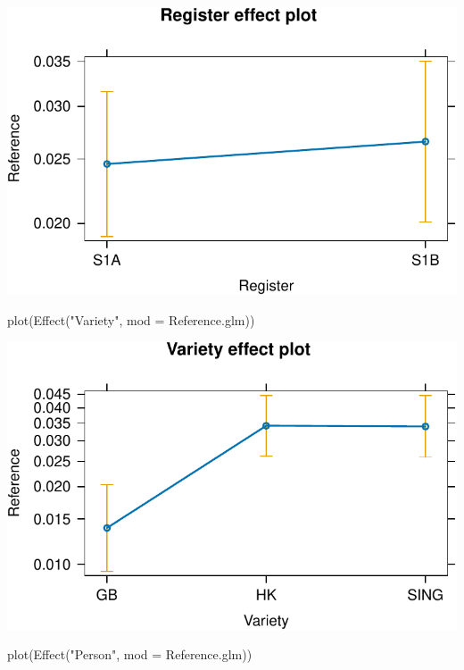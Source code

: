 \documentclass[
  11pt,
  letterpaper,
  DIV=11,
  numbers=noendperiod]{scrreprt}
\newenvironment{Shaded}{\begin{snugshade}}{\end{snugshade}}
\newcommand{\AttributeTok}[1]{\textcolor[rgb]{0.40,0.45,0.13}{#1}}
\newcommand{\FunctionTok}[1]{\textcolor[rgb]{0.28,0.35,0.67}{#1}}
\newcommand{\NormalTok}[1]{\textcolor[rgb]{0.00,0.23,0.31}{#1}}
\newcommand{\StringTok}[1]{\textcolor[rgb]{0.13,0.47,0.30}{#1}}
\begin{document}
\includegraphics{Logistic_regression_files/figure-pdf/unnamed-chunk-12-3.pdf}

\begin{Shaded}
\begin{Highlighting}[]
\FunctionTok{plot}\NormalTok{(}\FunctionTok{Effect}\NormalTok{(}\StringTok{"Variety"}\NormalTok{, }\AttributeTok{mod =}\NormalTok{ Reference.glm))}
\end{Highlighting}
\end{Shaded}

\includegraphics{Logistic_regression_files/figure-pdf/unnamed-chunk-12-4.pdf}

\begin{Shaded}
\begin{Highlighting}[]
\FunctionTok{plot}\NormalTok{(}\FunctionTok{Effect}\NormalTok{(}\StringTok{"Person"}\NormalTok{, }\AttributeTok{mod =}\NormalTok{ Reference.glm))}
\end{Highlighting}
\end{Shaded}
\end{document}
